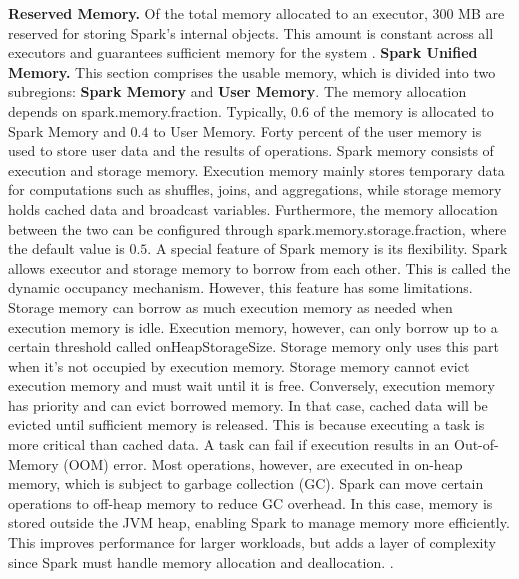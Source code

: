 \textbf{Reserved Memory.} Of the total memory allocated to an executor, 300 MB are reserved for storing Spark's internal objects. This amount is constant across all executors and guarantees sufficient memory for the system \cite{apache_spark_configuration_2025}.
\textbf{Spark Unified Memory.} This section comprises the usable memory, which is divided into two subregions: \textbf{Spark Memory} and \textbf{User Memory}. The memory allocation depends on spark.memory.fraction. Typically, $0.6$ of the memory is allocated to Spark Memory and $0.4$ to User Memory. Forty percent of the user memory is used to store user data and the results of operations. Spark memory consists of execution and storage memory. Execution memory mainly stores temporary data for computations such as shuffles, joins, and aggregations, while storage memory holds cached data and broadcast variables. Furthermore, the memory allocation between the two can be configured through spark.memory.storage.fraction, where the default value is $0.5$. A special feature of Spark memory is its flexibility. Spark allows executor and storage memory to borrow from each other. This is called the dynamic occupancy mechanism. However, this feature has some limitations. Storage memory can borrow as much execution memory as needed when execution memory is idle. Execution memory, however, can only borrow up to a certain threshold called onHeapStorageSize. Storage memory only uses this part when it's not occupied by execution memory. Storage memory cannot evict execution memory and must wait until it is free. Conversely, execution memory has priority and can evict borrowed memory. In that case, cached data will be evicted until sufficient memory is released. This is because executing a task is more critical than cached data. A task can fail if execution results in an Out-of-Memory (OOM) error. Most operations, however, are executed in on-heap memory, which is subject to garbage collection (GC). Spark can move certain operations to off-heap memory to reduce GC overhead. In this case, memory is stored outside the JVM heap, enabling Spark to manage memory more efficiently. This improves performance for larger workloads, but adds a layer of complexity since Spark must handle memory allocation and deallocation. \cite{chambers_spark_2018}\cite{apache_spark_tuning_2025}. 


